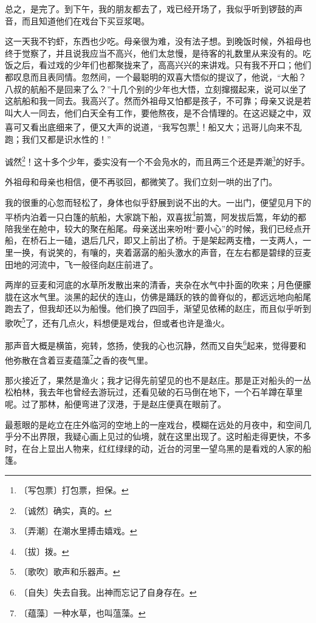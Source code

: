 \documentclass[12pt,UTF-8,openany]{ctexbook}
\begin{document}
\begin{normalsize}
    总之，是完了。到下午，我的朋友都去了，戏已经开场了，我似乎听到锣鼓的声音，而且知道他们在戏台下买豆浆喝。
    
    这一天我不钓虾，东西也少吃。母亲很为难，没有法子想。到晚饭时候，外祖母也终于觉察了，并且说我应当不高兴，他们太怠慢，是待客的礼数里从来没有的。吃饭之后，看过戏的少年们也都聚拢来了，高高兴兴的来讲戏。只有我不开口；他们都叹息而且表同情。忽然间，一个最聪明的双喜大悟似的提议了，他说，“大船？八叔的航船不是回来了么？”十几个别的少年也大悟，立刻撺掇起来，说可以坐了这航船和我一同去。我高兴了。然而外祖母又怕都是孩子，不可靠；母亲又说是若叫大人一同去，他们白天全有工作，要他熬夜，是不合情理的。在这迟疑之中，双喜可又看出底细来了，便又大声的说道，“我写包票\footnote{〔写包票〕打包票，担保。}！船又大；迅哥儿向来不乱跑；我们又都是识水性的！”
    
    诚然\footnote{〔诚然〕确实，真的。}！这十多个少年，委实没有一个不会凫水的，而且两三个还是弄潮\footnote{〔弄潮〕在潮水里搏击嬉戏。}的好手。
    
    外祖母和母亲也相信，便不再驳回，都微笑了。我们立刻一哄的出了门。
    
    我的很重的心忽而轻松了，身体也似乎舒展到说不出的大。一出门，便望见月下的平桥内泊着一只白篷的航船，大家跳下船，双喜拔\footnote{〔拔〕拨。}前篙，阿发拔后篙，年幼的都陪我坐在舱中，较大的聚在船尾。母亲送出来吩咐“要小心”的时候，我们已经点开船，在桥石上一磕，退后几尺，即又上前出了桥。于是架起两支橹，一支两人，一里一换，有说笑的，有嚷的，夹着潺潺的船头激水的声音，在左右都是碧绿的豆麦田地的河流中，飞一般径向赵庄前进了。
    
    两岸的豆麦和河底的水草所发散出来的清香，夹杂在水气中扑面的吹来；月色便朦胧在这水气里。淡黑的起伏的连山，仿佛是踊跃的铁的兽脊似的，都远远地向船尾跑去了，但我却还以为船慢。他们换了四回手，渐望见依稀的赵庄，而且似乎听到歌吹\footnote{〔歌吹〕歌声和乐器声。}了，还有几点火，料想便是戏台，但或者也许是渔火。
    
    那声音大概是横笛，宛转，悠扬，使我的心也沉静，然而又自失\footnote{〔自失〕失去自我。出神而忘记了自身存在。}起来，觉得要和他弥散在含着豆麦蕴藻\footnote{〔蕴藻〕一种水草，也叫蕰藻。}之香的夜气里。
    
    那火接近了，果然是渔火；我才记得先前望见的也不是赵庄。那是正对船头的一丛松柏林，我去年也曾经去游玩过，还看见破的石马倒在地下，一个石羊蹲在草里呢。过了那林，船便弯进了汊港，于是赵庄便真在眼前了。
    
    最惹眼的是屹立在庄外临河的空地上的一座戏台，模糊在远处的月夜中，和空间几乎分不出界限，我疑心画上见过的仙境，就在这里出现了。这时船走得更快，不多时，在台上显出人物来，红红绿绿的动，近台的河里一望乌黑的是看戏的人家的船篷。
    

\end{normalsize}
\end{document}
